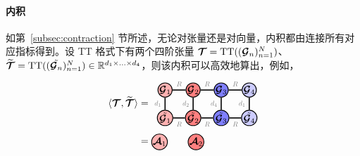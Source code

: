 \paragraph{内积}
如第~\ref{subsec:contraction} 节所述，无论对张量还是对向量，内积都由连接所有对应指标得到。设 TT 格式下有两个四阶张量 $\bm{\mathcal{T}}=\operatorname*{\operatorname{TT}}(({\bm{\mathcal{G}}_n})_{n=1}^N)$、$\widetilde{\bm{\mathcal{T}}}=\operatorname*{\operatorname{TT}}(({\Tilde{\bm{\mathcal{G}}_n}})_{n=1}^N)\in\mathbb{R}^{d_1\times...\times d_4}$，则该内积可以高效地算出，例如，
\begin{align}\label{eq:tt-inner}
\langle\Tt,\widetilde{\Tt}\rangle 
&=
    \begin{tikzpicture}[baseline=\baseline]
    \tikzset{tensor/.style = {minimum size = 0.5cm,shape = circle,thick,draw=black,inner sep = 0pt}, edge/.style   = {thick,line width=.4mm},every loop/.style={}}
    \def\y{0}
    \def\x{0}
  \node[tensor,fill=red!30!white] (G1) at (\x,\y+0.5){$\Gt_1$};
  \node[tensor,fill=red!50!white] (G2) at (\x+1,\y+0.5){$\Gt_2$};
  \node[tensor,fill=blue!50!white] (G3) at (\x+2,\y+0.5){$\Gt_3$};
   \node[tensor,fill=blue!20!white] (G4) at (\x+3,\y+0.5){$\Gt_4$};
\node[tensor,fill=red!30!white] (Gtilde1) at (\x,\y-0.5){$\Tilde{\Gt_1}$};
  \node[tensor,fill=red!50!white] (Gtilde2) at (\x+1,\y-0.5){$\Tilde{\Gt_2}$};
  \node[tensor,fill=blue!50!white] (Gtilde3) at (\x+2,\y-0.5){$\Tilde{\Gt_3}$};
   \node[tensor,fill=blue!20!white] (Gtilde4) at (\x+3,\y-0.5){$\Tilde{\Gt_4}$};
    \draw[edge](G1) -- (Gtilde1)node [midway,left] {\edgelabel{$d_1$}};
    \draw[edge](G2) -- (Gtilde2)node [midway,left] {\edgelabel{$d_2$}};
    \draw[edge](G3) -- (Gtilde3)node [midway,left] {\edgelabel{$d_4$}};
     \draw[edge](G4) -- (Gtilde4)node [midway,left] {\edgelabel{$d_1$}};
    \draw[edge](G1) -- (G2) node [midway,above] {\edgelabel{$R$}};
    \draw[edge](G2) -- (G3) node [midway,above] {\edgelabel{$R$}};
    \draw[edge](G3) -- (G4) node [midway,above] {\edgelabel{$R$}};
    \draw[edge](Gtilde1) -- (Gtilde2) node [midway,below] {\edgelabel{$R$}};
    \draw[edge](Gtilde2) -- (Gtilde3) node [midway,below] {\edgelabel{$R$}};
    \draw[edge](Gtilde3) -- (Gtilde4) node [midway,below] {\edgelabel{$R$}};
\end{tikzpicture}\nonumber\\
&=
\begin{tikzpicture}[baseline=\baseline]
    \tikzset{tensor/.style = {minimum size = 0.5cm,shape = circle,thick,draw=black,inner sep = 0pt}, edge/.style   = {thick,line width=.4mm},every loop/.style={}}
    \def\y{0}
    \def\x{0}
      \node[tensor,fill=red!30!white] (At_1) at (\x+4.2,\y){$\At_1$};
  \node[tensor,fill=red!50!white] (At_2) at (\x+5.5,\y){$\At_2$};

\end{tikzpicture}
\end{align}
